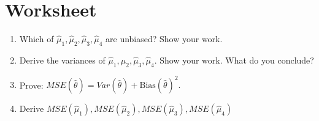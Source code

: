 \documentclass[12pt]{article}
\begin{document}
\clearpage


\section*{Worksheet}


\begin{enumerate}\itemsep1em
\item Which of $\hat\mu_{1}, \hat\mu_{2}, \hat\mu_{3}, \hat\mu_{4}$ are unbiased? Show your work.
\vspace{20em}

\item Derive the variances of $\hat\mu_{1}, \hat\mu_{2}, \hat\mu_{3}, \hat\mu_{4}$. Show your work. What do you conclude?
\vspace{20em}
\clearpage 

\item Prove: $MSE(\hat{\theta}) = Var(\hat{\theta}) + \text{Bias}(\hat{\theta})^2.$
\vspace{25em}


\item Derive $MSE(\hat\mu_{1}), MSE(\hat\mu_{2}), MSE(\hat\mu_{3}), MSE(\hat\mu_{4})$
\vspace{20em}


\end{enumerate}


\end{document}
